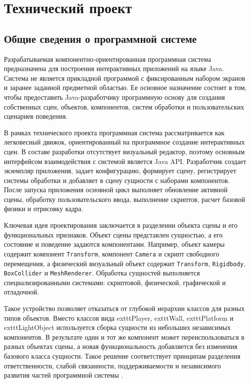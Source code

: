 
\section{Технический проект}

\subsection{Общие сведения о программной системе}

Разрабатываемая компонентно-ориентированная программная система предназначена
для построения интерактивных приложений на языке Java. Система не является
прикладной программой с фиксированным набором экранов и заранее заданной
предметной областью. Ее основное назначение состоит в том, чтобы предоставить
Java-разработчику программную основу для создания собственных сцен, объектов,
компонентов, систем обработки и пользовательских сценариев поведения.

В рамках технического проекта программная система рассматривается как
легковесный движок, ориентированный на программное создание интерактивных
сцен. В составе разработки отсутствует визуальный редактор, поэтому основным
интерфейсом взаимодействия с системой является Java API. Разработчик создает
экземпляр приложения, задает конфигурацию, формирует сцену, регистрирует
системы обработки и добавляет в сцену сущности с наборами компонентов.
После запуска приложения основной цикл выполняет обновление активной сцены,
обработку пользовательского ввода, выполнение скриптов, расчет базовой физики
и отрисовку кадра.

Ключевая идея проектирования заключается в разделении объекта сцены и его
функциональных признаков. Объект сцены представлен сущностью, а его состояние
и поведение задаются компонентами. Например, объект камеры содержит компонент
\texttt{Transform}, компонент \texttt{Camera} и скрипт свободного перемещения,
а физический визуальный объект содержит \texttt{Transform}, \texttt{Rigidbody},
\texttt{BoxCollider} и \texttt{MeshRenderer}. Обработка сущностей выполняется
специализированными системами: скриптовой, физической, графической и
отладочной.

Такое устройство позволяет отказаться от глубокой иерархии классов для
разных типов объектов. Вместо классов вида 	exttt{Player}, 	exttt{Wall},
	exttt{Platform} и 	exttt{LightObject} используется сборка сущности из
небольших независимых компонентов. В результате один и тот же компонент может
переиспользоваться в разных объектах сцены, а новая функциональность добавляется
без изменения базового класса сущности. Такое решение соответствует принципам
разделения ответственности, слабой связанности, поддерживаемости и независимого
развития частей программной системы
\cite{martin-clean-architecture,fowler-refactoring,sommerville-software-engineering,pressman-software-engineering}.


